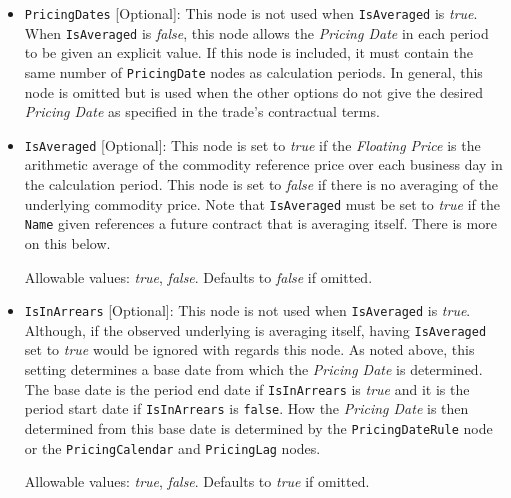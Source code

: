\begin{itemize}
\item
\lstinline!PricingDates! [Optional]: This node is not used when \lstinline!IsAveraged! is \emph{true}. When \lstinline!IsAveraged! is \emph{false}, this node allows the \textit{Pricing Date} in each period to be given an explicit value. If this node is included, it must contain the same number of \lstinline!PricingDate! nodes as calculation periods. In general, this node is omitted but is used when the other options do not give the desired \textit{Pricing Date} as specified in the trade's contractual terms.

\item
\lstinline!IsAveraged! [Optional]: This node is set to \emph{true} if the \textit{Floating Price} is the arithmetic average of the commodity reference price over each business day in the calculation period. This node is set to \emph{false} if there is no averaging of the underlying commodity price.  Note that \lstinline!IsAveraged! must be set to \emph{true} if the \lstinline!Name! given references a future contract that is averaging itself. There is more on this below.

Allowable values: \emph{true}, \emph{false}. Defaults to \emph{false} if omitted.

\item
\lstinline!IsInArrears! [Optional]: This node is not used when \lstinline!IsAveraged! is \emph{true}. Although, if the observed underlying is averaging itself, having \lstinline!IsAveraged! set to \emph{true} would be ignored with regards this node. As noted above, this setting determines a base date from which the \textit{Pricing Date} is determined. The base date is the period end date if \lstinline!IsInArrears! is \emph{true} and it is the period start date if \lstinline!IsInArrears! is \lstinline!false!. How the \textit{Pricing Date} is then determined from this base date is determined by the \lstinline!PricingDateRule! node or the \lstinline!PricingCalendar! and \lstinline!PricingLag! nodes. 

Allowable values: \emph{true}, \emph{false}. Defaults to \emph{true} if omitted.


\end{itemize}
